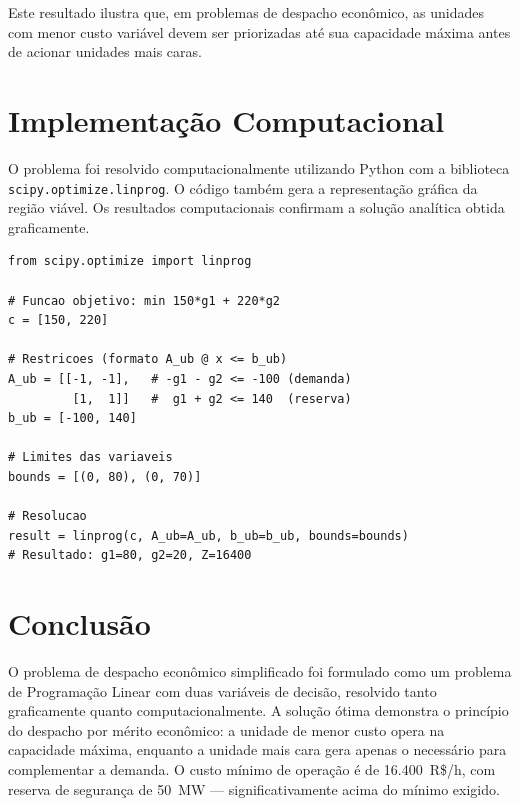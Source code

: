 \documentclass[12pt,a4paper]{article}
\begin{document}
\noindent Este resultado ilustra que, em problemas de despacho econômico, as unidades com menor custo variável devem ser priorizadas até sua capacidade máxima antes de acionar unidades mais caras.

\section{Implementação Computacional}

O problema foi resolvido computacionalmente utilizando Python com a biblioteca \texttt{scipy.optimize.linprog}. O código também gera a representação gráfica da região viável. Os resultados computacionais confirmam a solução analítica obtida graficamente.

\begin{lstlisting}[style=python, caption={Trecho principal da implementação}]
from scipy.optimize import linprog

# Funcao objetivo: min 150*g1 + 220*g2
c = [150, 220]

# Restricoes (formato A_ub @ x <= b_ub)
A_ub = [[-1, -1],   # -g1 - g2 <= -100 (demanda)
         [1,  1]]   #  g1 + g2 <= 140  (reserva)
b_ub = [-100, 140]

# Limites das variaveis
bounds = [(0, 80), (0, 70)]

# Resolucao
result = linprog(c, A_ub=A_ub, b_ub=b_ub, bounds=bounds)
# Resultado: g1=80, g2=20, Z=16400
\end{lstlisting}

\section{Conclusão}

O problema de despacho econômico simplificado foi formulado como um problema de Programação Linear com duas variáveis de decisão, resolvido tanto graficamente quanto computacionalmente. A solução ótima demonstra o princípio do despacho por mérito econômico: a unidade de menor custo opera na capacidade máxima, enquanto a unidade mais cara gera apenas o necessário para complementar a demanda. O custo mínimo de operação é de 16.400~R\$/h, com reserva de segurança de 50~MW — significativamente acima do mínimo exigido.
\end{document}

